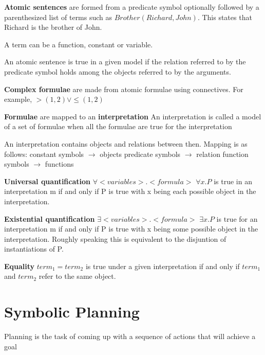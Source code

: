 \documentclass{article}
\begin{document}
\textbf{Atomic sentences} are formed from a predicate symbol optionally followed by a parenthesized list of terms such as $Brother(Richard,John)$. This states that Richard is the brother of John.

A term can be a function, constant or variable. \newline

An atomic sentence is true in a given model if the relation referred to by the predicate symbol holds among the objects referred to by the arguments. \newline 

\textbf{Complex formulae} are made from atomic formulae using connectives. For example, $>(1,2) \vee \leq(1,2)$ \newline

\textbf{Formulae} are mapped to an \textbf{interpretation} \newline 
An interpretation is called a model of a set of formulae when all the formulae are true for the interpretation \newline

An interpretation contains objects and relations between then. Mapping is as follows:
constant symbols $\rightarrow$ objects
predicate symbols $\rightarrow$ relation
function symbols $\rightarrow$ functions \newline 

\textbf{Universal quantification}
$\forall <variables>.<formula>$
$\forall x.P$ is true in an interpretation m if and only if P is true with x being each possible object in the interpretation. \newline

\textbf{Existential quantification}
$\exists <variables>.<formula>$
$\exists x. P$ is true for an interpretation m if and only if P is true with x being some possible object in the interpretation. Roughly speaking this is equivalent to the disjuntion of instantiations of P. \newline

\textbf{Equality}
$term_1 = term_2$ is true under a given interpretation if and only if $term_1$ and $term_2$ refer to the same object. \newline

\section{Symbolic Planning}

Planning is the task of coming up with a sequence of actions that will achieve a goal
\end{document}
